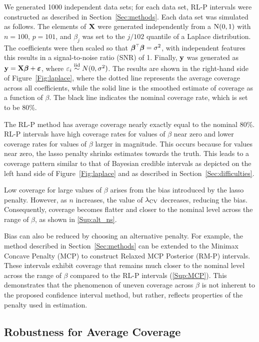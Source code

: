 We generated 1000 independent data sets; for each data set, RL-P intervals were constructed as described in Section~\ref{Sec:methods}. Each data set was simulated as follows. The elements of $\mathbf{X}$ were generated independently from a $\textrm{N}(0, 1)$ with $n = 100$, $p = 101$, and $\beta_j$ was set to the $j/102$ quantile of a Laplace distribution. The coefficients were then scaled so that $\boldsymbol{\beta} ^{\scriptscriptstyle\top}\boldsymbol{\beta} = \sigma^2$, with independent features this results in a signal-to-noise ratio (SNR) of 1. Finally, $\mathbf{y}$ was generated as $\mathbf{y} = \mathbf{X}\boldsymbol{\beta} + \boldsymbol{\varepsilon}$, where $\varepsilon_i \overset{\text{iid}}{\sim} N(0, \sigma^2)$. The results are shown in the right-hand side of Figure~\ref{Fig:laplace}, where the dotted line represents the average coverage across all coefficients, while the solid line is the smoothed estimate of coverage as a function of $\beta$. The black line indicates the nominal coverage rate, which is set to be 80\%.

The RL-P method has average coverage nearly exactly equal to the nominal 80\%. RL-P intervals have high coverage rates for values of $\beta$ near zero and lower coverage rates for values of $\beta$ larger in magnitude. This occurs because for values near zero, the lasso penalty shrinks estimates towards the truth. This leads to a coverage pattern similar to that of Bayesian credible intervals as depicted on the left hand side of Figure~\ref{Fig:laplace} and as described in Section~\ref{Sec:difficulties}.

Low coverage for large values of $\beta$ arises from the bias introduced by the lasso penalty. However, as $n$ increases, the value of $\lambda_{\textrm{CV}}$ decreases, reducing the bias. Consequently, coverage becomes flatter and closer to the nominal level across the range of $\beta$, as shown in \ref{Sup:alt_ns}.

Bias can also be reduced by choosing an alternative penalty. For example, the method described in Section~\ref{Sec:methods} can be extended to the Minimax Concave Penalty (MCP) to construct Relaxed MCP Posterior (RM-P) intervals. These intervals exhibit coverage that remains much closer to the nominal level across the range of $\beta$ compared to the RL-P intervals (\ref{Sup:MCP}). This demonstrates that the phenomenon of uneven coverage across $\beta$ is not inherent to the proposed confidence interval method, but rather, reflects properties of the penalty used in estimation.

\subsection{Robustness for Average Coverage}
\label{Sec:robustness}

